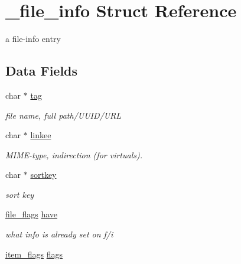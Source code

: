 \hypertarget{struct__file__info}{
\section{\_\-file\_\-info Struct Reference}
\label{struct__file__info}
}
a file-info entry  


\subsection*{Data Fields}
\begin{CompactItemize}
\item 
\hypertarget{struct__file__info_o1}{
char $\ast$ \hyperlink{struct__file__info_o1}{tag}}
\label{struct__file__info_o1}

\begin{CompactList}\small\item\em file name, full path/UUID/URL \item\end{CompactList}\item 
\hypertarget{struct__file__info_o3}{
char $\ast$ \hyperlink{struct__file__info_o3}{linkee}}
\label{struct__file__info_o3}

\begin{CompactList}\small\item\em MIME-type, indirection (for virtuals). \item\end{CompactList}\item 
\hypertarget{struct__file__info_o4}{
char $\ast$ \hyperlink{struct__file__info_o4}{sortkey}}
\label{struct__file__info_o4}

\begin{CompactList}\small\item\em sort key \item\end{CompactList}\item 
\hypertarget{struct__file__info_o5}{
\hyperlink{model_8h_a151}{file\_\-flags} \hyperlink{struct__file__info_o5}{have}}
\label{struct__file__info_o5}

\begin{CompactList}\small\item\em what info is already set on f/i \item\end{CompactList}\item 
\hypertarget{struct__file__info_o6}{
\hyperlink{model_8h_a152}{item\_\-flags} \hyperlink{struct__file__info_o6}{flags}}
\label{struct__file__info_o6}


\end{CompactItemize}
